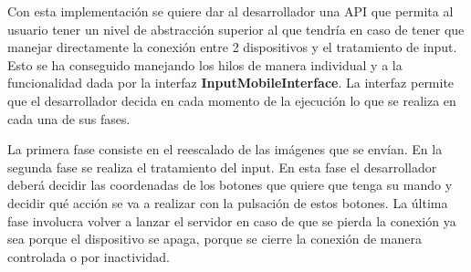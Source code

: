 Con esta implementaci\'on se quiere dar al desarrollador una API que permita al usuario tener un nivel de abstracci\'on superior al que tendr\'ia en caso de tener que manejar directamente la conexi\'on entre 2 dispositivos y el tratamiento de input. Esto se ha conseguido manejando los hilos de manera individual y a la funcionalidad dada por la interfaz \textbf{InputMobileInterface}. La interfaz permite que el desarrollador decida en cada momento de la ejecuci\'on lo que se realiza en cada una de sus fases.

La primera fase consiste en el reescalado de las im\'agenes que se env\'ian. En la segunda fase se realiza el tratamiento del input. En esta fase el desarrollador deber\'a decidir las coordenadas de los botones que quiere que tenga su mando y decidir qu\'e acci\'on se va a realizar con la pulsaci\'on de estos botones. La \'ultima fase involucra volver a lanzar el servidor en caso de que se pierda la conexi\'on ya sea porque el dispositivo se apaga, porque se cierre la conexi\'on de manera controlada o por inactividad.

